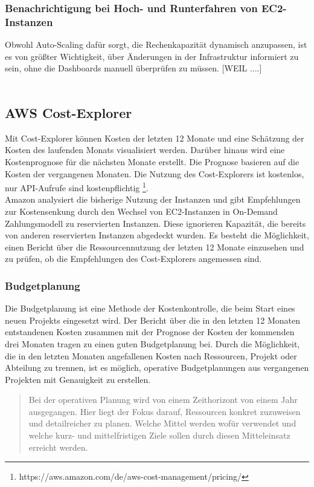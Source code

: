 \subsubsection*{Benachrichtigung bei Hoch- und Runterfahren von EC2-Instanzen}
Obwohl Auto-Scaling dafür sorgt, die Rechenkapazität dynamisch anzupassen, ist es von größter Wichtigkeit, über Änderungen in der Infrastruktur informiert zu sein, ohne die Dashboards manuell überprüfen zu müssen.
[WEIL ....]
\\\\
\subsection{AWS Cost-Explorer}
Mit Cost-Explorer können Kosten der letzten 12 Monate und eine Schätzung der Kosten des laufenden Monats visualisiert werden. Darüber hinaus wird eine Kostenprognose für die nächsten Monate erstellt. Die Prognose basieren auf die Kosten der vergangenen Monaten. Die Nutzung des Cost-Explorers ist kostenlos, nur API-Aufrufe sind kostenpflichtig \footnote{https://aws.amazon.com/de/aws-cost-management/pricing/}.
\\
Amazon analysiert die bisherige Nutzung der Instanzen und gibt Empfehlungen zur Kostensenkung durch den Wechsel von EC2-Instanzen in On-Demand Zahlungsmodell zu reservierten Instanzen. Diese ignorieren Kapazität, die bereits von anderen reservierten Instanzen abgedeckt wurden.
Es besteht die Möglichkeit, einen Bericht über die Ressourcennutzung der letzten 12 Monate einzusehen und zu prüfen, ob die Empfehlungen des Cost-Explorers angemessen sind.

\subsubsection*{Budgetplanung}
Die Budgetplanung ist eine Methode der Kostenkontrolle, die beim Start eines neuen Projekts eingesetzt wird\cite{BUD2}. Der Bericht über die in den letzten 12 Monaten entstandenen Kosten zusammen mit der Prognose der Kosten der kommenden drei Monaten tragen zu einen guten Budgetplanung bei.
Durch die Möglichkeit, die in den letzten Monaten angefallenen Kosten nach Ressourcen, Projekt oder Abteilung zu trennen, ist es möglich, operative Budgetplanungen aus vergangenen Projekten mit Genauigkeit zu erstellen. 
\begin{quote}
Bei der operativen Planung wird von einem Zeithorizont von einem Jahr ausgegangen. Hier liegt der Fokus darauf, Ressourcen konkret zuzuweisen und detailreicher zu planen. Welche Mittel werden wofür verwendet und welche kurz- und mittelfristigen Ziele sollen durch diesen Mitteleinsatz erreicht werden.\cite{BUD1}
\end{quote}

